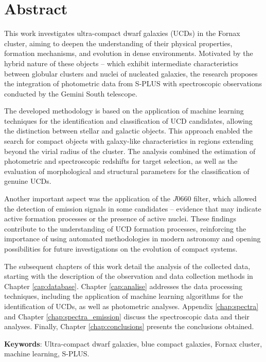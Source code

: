 \chapter*{Abstract}
This work investigates ultra-compact dwarf galaxies (UCDs) in the Fornax cluster, aiming to deepen the understanding of their physical properties, formation mechanisms, and evolution in dense environments. Motivated by the hybrid nature of these objects – which exhibit intermediate characteristics between globular clusters and nuclei of nucleated galaxies, the research proposes the integration of photometric data from S-PLUS with spectroscopic observations conducted by the Gemini South telescope.

The developed methodology is based on the application of machine learning techniques for the identification and classification of UCD candidates, allowing the distinction between stellar and galactic objects. This approach enabled the search for compact objects with galaxy-like characteristics in regions extending beyond the virial radius of the cluster. The analysis combined the estimation of photometric and spectroscopic redshifts for target selection, as well as the evaluation of morphological and structural parameters for the classification of genuine UCDs.

Another important aspect was the application of the $J0660$ filter, which allowed the detection of emission signals in some candidates – evidence that may indicate active formation processes or the presence of active nuclei. These findings contribute to the understanding of UCD formation processes, reinforcing the importance of using automated methodologies in modern astronomy and opening possibilities for future investigations on the evolution of compact systems.

The subsequent chapters of this work detail the analysis of the collected data, starting with the description of the observation and data collection methods in Chapter \ref{cap:database}. Chapter \ref{cap:analise} addresses the data processing techniques, including the application of machine learning algorithms for the identification of UCDs, as well as photometric analyses. Appendix \ref{chap:spectra} and Chapter \ref{chap:spectra_emission} discuss the spectroscopic data and their analyses. Finally, Chapter \ref{chap:conclusions} presents the conclusions obtained.

\textbf{Keywords}: Ultra-compact dwarf galaxies, blue compact galaxies, Fornax cluster, machine learning, S-PLUS.

\thispagestyle{empty}